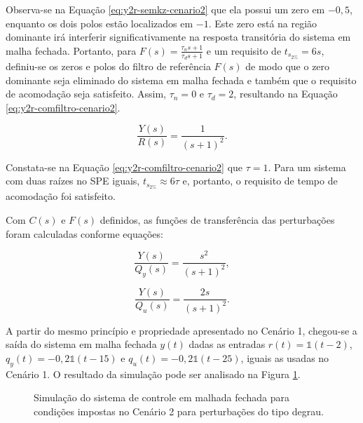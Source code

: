Observa-se na Equação \ref{eq:y2r-semkz-cenario2} que ela possui um zero em
$-0,5$, enquanto os dois polos estão localizados em $-1$. Este zero está na
região dominante irá interferir significativamente na resposta transitória do
sistema em malha fechada. Portanto, para $F(s) = \frac{\tau_{n}s + 1}{\tau_{d}s
+ 1}$ e um requisito de $t_{s_{2\%}} = 6s$, definiu-se os zeros e polos do
filtro de referência $F(s)$ de modo que o zero dominante seja eliminado do
sistema em malha fechada e também que o requisito de acomodação seja satisfeito.
Assim, $\tau_{n} = 0$ e $\tau_{d} = 2$, resultando na Equação
\ref{eq:y2r-comfiltro-cenario2}.

\begin{equation}
    \label{eq:y2r-comfiltro-cenario2}
    \frac{Y(s)}{R(s)} = \frac{1}{(s+1)^2}.
\end{equation}

Constata-se na Equação \ref{eq:y2r-comfiltro-cenario2} que $\tau = 1$. Para um
sistema com duas raízes no SPE iguais, $t_{s_{2\%}} \approx 6\tau$ e, portanto,
o requisito de tempo de acomodação foi satisfeito.

Com $C(s)$ e $F(s)$ definidos, as funções de transferência das perturbações foram
calculadas conforme equações:

\begin{equation}
    \label{eq:y2qy-cenario2}
    \frac{Y(s)}{Q_{y}(s)} = \frac{s^2}{(s + 1)^2},
\end{equation}

\begin{equation}
    \label{eq:y2qu-cenario2}
    \frac{Y(s)}{Q_{u}(s)} = \frac{2s}{(s + 1)^2}.
\end{equation}

A partir do mesmo princípio e propriedade apresentado no Cenário 1, chegou-se a
saída do sistema em malha fechada $y(t)$ dadas as entradas
$r(t) = \mathds{1}(t - 2)$, $q_{y}(t) = -0,2\mathds{1}(t - 15)$ e
$q_{u}(t) = -0,2\mathds{1}(t - 25)$, iguais as usadas no Cenário 1. O resultado
da simulação pode ser analisado na Figura \ref{fig:resultado-desafio1-cenario2-a}.

\begin{figure}[!ht]
    \caption{Simulação do sistema de controle em malhada fechada para condições
    impostas no Cenário 2 para perturbações do tipo degrau.}
    \vspace{-10pt}
    \hspace{-30pt}
    \label{fig:resultado-desafio1-cenario2-a}
    \begin{minipage}{\linewidth}
        
    \end{minipage}
\end{figure}

